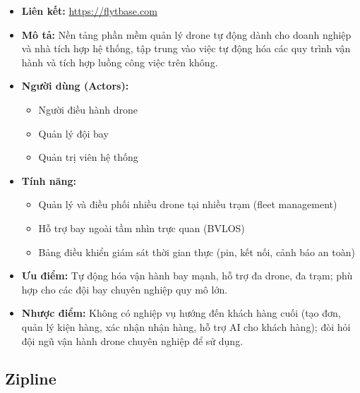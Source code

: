 \begin{itemize}
  \item \textbf{Liên kết:} \url{https://flytbase.com}
  \item \textbf{Mô tả:} Nền tảng phần mềm quản lý drone tự động dành cho doanh nghiệp và nhà tích hợp hệ thống, tập trung vào việc tự động hóa các quy trình vận hành và tích hợp luồng công việc trên không.
  \item \textbf{Người dùng (Actors):}
    \begin{itemize}
      \item Người điều hành drone
      \item Quản lý đội bay
      \item Quản trị viên hệ thống
    \end{itemize}
  \item \textbf{Tính năng:}
    \begin{itemize}
      \item Quản lý và điều phối nhiều drone tại nhiều trạm (fleet management)
      \item Hỗ trợ bay ngoài tầm nhìn trực quan (BVLOS)
      \item Bảng điều khiển giám sát thời gian thực (pin, kết nối, cảnh báo an toàn)
    \end{itemize}
  \item \textbf{Ưu điểm:} Tự động hóa vận hành bay mạnh, hỗ trợ đa drone, đa trạm; phù hợp cho các đội bay chuyên nghiệp quy mô lớn.
  \item \textbf{Nhược điểm:} Không có nghiệp vụ hướng đến khách hàng cuối (tạo đơn, quản lý kiện hàng, xác nhận nhận hàng, hỗ trợ AI cho khách hàng); đòi hỏi đội ngũ vận hành drone chuyên nghiệp để sử dụng.
\end{itemize}

\subsection{Zipline}

